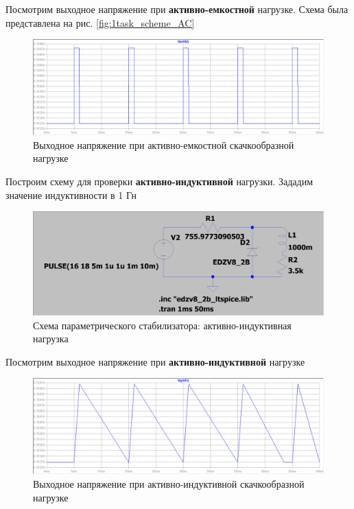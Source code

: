 \documentclass[a4paper, 12pt]{article}
\begin{document}
    \noindent Посмотрим выходное напряжение при \textbf{активно-емкостной} нагрузке. Схема
    была представлена на рис. \ref{fig:1task_scheme_AC}
    \begin{figure}[H]
        \centering
        \includegraphics[scale=0.46]{1task_rect_AC.png}
        \captionsetup{skip=0pt}
        \caption{Выходное напряжение при активно-емкостной скачкообразной нагрузке}
        \label{fig:1task_rect_AC}
    \end{figure}
    \noindent Построим схему для проверки \textbf{активно-индуктивной} нагрузки. Зададим
    значение индуктивности в 1 Гн
    \begin{figure}[H]
        \centering
        \includegraphics[scale=0.22]{1task_scheme_AL.png}
        \captionsetup{skip=0pt}
        \caption{Схема параметрического стабилизатора: активно-индуктивная нагрузка}
        \label{fig:1task_scheme_AL}
    \end{figure}
    \noindent Посмотрим выходное напряжение при \textbf{активно-индуктивной} нагрузке
    \begin{figure}[H]
        \centering
        \includegraphics[scale=0.46]{1task_rect_AL.png}
        \captionsetup{skip=0pt}
        \caption{Выходное напряжение при активно-индуктивной скачкообразной нагрузке}
        \label{fig:1task_rect_AL}
    \end{figure}
\end{document}
